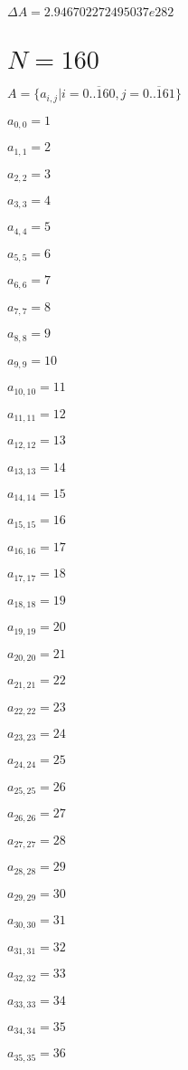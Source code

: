 \documentclass[a4paper,12pt]{article}
\begin{document}
$\Delta A = 2.946702272495037e282$



\section{ $N = 160$ }
$A = \{ a _{ i, j } | i = \overline { 0..160 }, j = \overline { 0..161 } \}$

$a _{ 0, 0 } = 1$

$a _{ 1, 1 } = 2$

$a _{ 2, 2 } = 3$

$a _{ 3, 3 } = 4$

$a _{ 4, 4 } = 5$

$a _{ 5, 5 } = 6$

$a _{ 6, 6 } = 7$

$a _{ 7, 7 } = 8$

$a _{ 8, 8 } = 9$

$a _{ 9, 9 } = 10$

$a _{ 10, 10 } = 11$

$a _{ 11, 11 } = 12$

$a _{ 12, 12 } = 13$

$a _{ 13, 13 } = 14$

$a _{ 14, 14 } = 15$

$a _{ 15, 15 } = 16$

$a _{ 16, 16 } = 17$

$a _{ 17, 17 } = 18$

$a _{ 18, 18 } = 19$

$a _{ 19, 19 } = 20$

$a _{ 20, 20 } = 21$

$a _{ 21, 21 } = 22$

$a _{ 22, 22 } = 23$

$a _{ 23, 23 } = 24$

$a _{ 24, 24 } = 25$

$a _{ 25, 25 } = 26$

$a _{ 26, 26 } = 27$

$a _{ 27, 27 } = 28$

$a _{ 28, 28 } = 29$

$a _{ 29, 29 } = 30$

$a _{ 30, 30 } = 31$

$a _{ 31, 31 } = 32$

$a _{ 32, 32 } = 33$

$a _{ 33, 33 } = 34$

$a _{ 34, 34 } = 35$

$a _{ 35, 35 } = 36$
\end{document}
